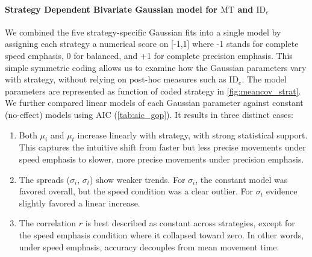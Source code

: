 \documentclass[acmlarge, manuscript,review]{acmart}
\newcommand{\mmt}{\ensuremath{\overline{\mt}}\xspace}
\newcommand{\mt}{\ensuremath{{\text{MT}}}\xspace}
\newcommand{\ide}{\ensuremath{{\text{ID}_e}}\xspace}
\begin{document}
\paragraph{Strategy Dependent Bivariate Gaussian model for \mmt and \ide}
We combined the five strategy-specific Gaussian fits into a single model by assigning each strategy a numerical score on [-1,1] where -1 stands for complete speed emphasis, 0 for balanced, and +1 for complete precision emphasis. This simple symmetric coding allows us to examine how the Gaussian parameters vary with strategy, without relying on post-hoc measures such as \ide. The model parameters are represented as function of coded strategy in \autoref{fig:meancov_strat}. We further compared linear models of each Gaussian parameter against constant (no-effect) models using AIC (\autoref{tab:aic_gop}). It results in three distinct cases:
\begin{enumerate}
	\item Both $\mu_i$ and $\mu_t$ increase linearly with strategy, with strong statistical support. This captures the intuitive shift from faster but less precise movements under speed emphasis to slower, more precise movements under precision emphasis.
	\item The spreads ($\sigma_i$, $\sigma_t$) show weaker trends. For $\sigma_i$, the constant model was favored overall, but the speed condition was a clear outlier. For $\sigma_t$ evidence slightly favored a linear increase.
	\item The correlation $r$ is best described as constant across strategies, except for the speed emphasis condition where it collapsed toward zero. In other words, under speed emphasis, accuracy decouples from mean movement time.
\end{enumerate}

\end{document}
